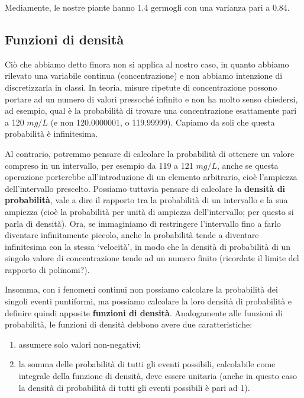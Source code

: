\documentclass[a4paper,12pt,oneside]{book}
\providecommand{\tightlist}{%
  \setlength{\itemsep}{0pt}\setlength{\parskip}{0pt}}
\begin{document}
Mediamente, le nostre piante hanno 1.4 germogli con una varianza pari a 0.84.

\hypertarget{funzioni-di-densituxe0}{%
\subsection{Funzioni di densità}\label{funzioni-di-densituxe0}}

Ciò che abbiamo detto finora non si applica al nostro caso, in quanto abbiamo rilevato una variabile continua (concentrazione) e non abbiamo intenzione di discretizzarla in classi. In teoria, misure ripetute di concentrazione possono portare ad un numero di valori pressoché infinito e non ha molto senso chiedersi, ad esempio, qual è la probabilità di trovare una concentrazione esattamente pari a 120 \(mg/L\) (e non 120.0000001, o 119.99999). Capiamo da soli che questa probabilità è infinitesima.

Al contrario, potremmo pensare di calcolare la probabilità di ottenere un valore compreso in un intervallo, per esempio da 119 a 121 \(mg/L\), anche se questa operazione porterebbe all'introduzione di un elemento arbitrario, cioè l'ampiezza dell'intervallo prescelto. Possiamo tuttavia pensare di calcolare la \textbf{densità di probabilità}, vale a dire il rapporto tra la probabilità di un intervallo e la sua ampiezza (cioè la probabilità per unità di ampiezza dell'intervallo; per questo si parla di densità). Ora, se immaginiamo di restringere l'intervallo fino a farlo diventare infinitamente piccolo, anche la probabilità tende a diventare infinitesima con la stessa `velocità', in modo che la densità di probabilità di un singolo valore di concentrazione tende ad un numero finito (ricordate il limite del rapporto di polinomi?).

Insomma, con i fenomeni continui non possiamo calcolare la probabilità dei singoli eventi puntiformi, ma possiamo calcolare la loro densità di probabilità e definire quindi apposite \textbf{funzioni di densità}. Analogamente alle funzioni di probabilità, le funzioni di densità debbono avere due caratteristiche:

\begin{enumerate}
\def\labelenumi{\arabic{enumi}.}
\tightlist
\item
  assumere solo valori non-negativi;
\item
  la somma delle probabilità di tutti gli eventi possibili, calcolabile come integrale della funzione di densità, deve essere unitaria (anche in questo caso la densità di probabilità di tutti gli eventi possibili è pari ad 1).
\end{enumerate}
\end{document}
